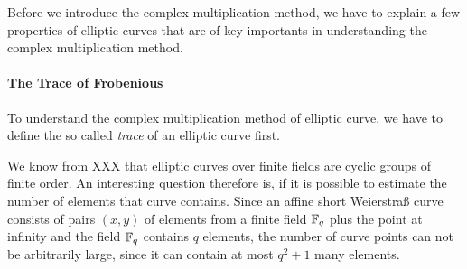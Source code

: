 Before we introduce the complex multiplication method, we have to explain a few properties of elliptic curves that are of key importants in understanding the complex multiplication method.
\paragraph{The Trace of Frobenious} To understand the complex multiplication method of elliptic curve, we have to define the so called \textit{trace} of an elliptic curve first.

We know from XXX that elliptic curves over finite fields are cyclic groups of finite order. An interesting question therefore is, if it is possible to estimate the number of elements that curve contains. Since an affine short Weierstraß curve consists of pairs $(x,y)$ of elements from a finite field $\mathbb{F}_q$ plus the point at infinity and the field $\mathbb{F}_q$ contains $q$ elements, the number of curve points can not be arbitrarily large, since it can contain at most $q^2+1$ many elements.

